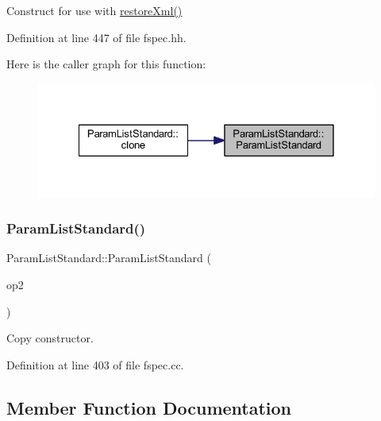 Construct for use with \mbox{\hyperlink{class_param_list_standard_a7dc8219ff6422f4e23d12643b68eb100}{restore\+Xml()}} 



Definition at line 447 of file fspec.\+hh.

Here is the caller graph for this function\+:
\nopagebreak
\begin{figure}[H]
\begin{center}
\leavevmode
\includegraphics[width=328pt]{class_param_list_standard_a78acde89ba28272697adefdf14f13a11_icgraph}
\end{center}
\end{figure}
\mbox{\label{class_param_list_standard_a0267994ed8c3c3e203b09dde4e7836be}} 
\subsubsection{\texorpdfstring{ParamListStandard()}{ParamListStandard()}\hspace{0.1cm}{\footnotesize\ttfamily [2/2]}}
{\footnotesize\ttfamily Param\+List\+Standard\+::\+Param\+List\+Standard (\begin{DoxyParamCaption}\item[{const \mbox{\hyperlink{class_param_list_standard}{Param\+List\+Standard}} \&}]{op2 }\end{DoxyParamCaption})}



Copy constructor. 



Definition at line 403 of file fspec.\+cc.



\subsection{Member Function Documentation}
\mbox{\label{class_param_list_standard_a3775b16cc55e45ffb7c6626e99a935b7}} 
